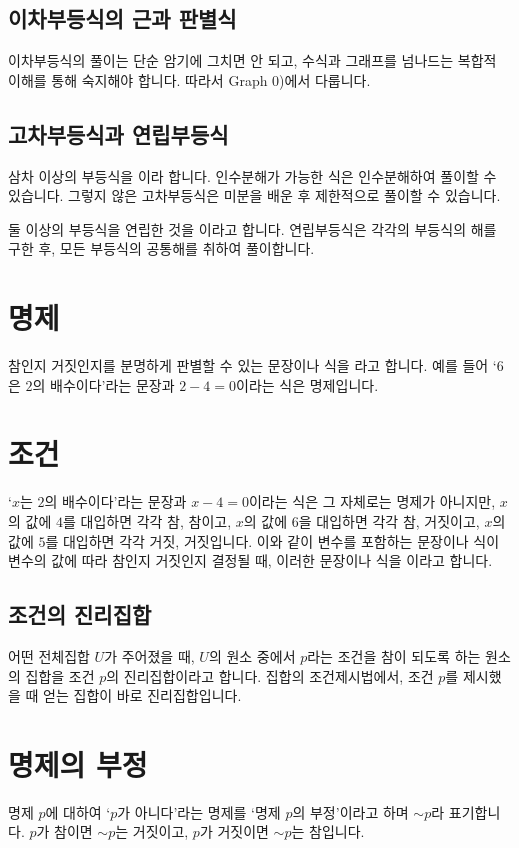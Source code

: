 \subsection{이차부등식의 근과 판별식}
이차부등식의 풀이는 단순 암기에 그치면 안 되고, 수식과 그래프를 넘나드는 복합적 이해를 통해 숙지해야 합니다. 따라서 Graph 0)에서 다룹니다.

\subsection{고차부등식과 연립부등식}
삼차 이상의 부등식을 이라 합니다. 인수분해가 가능한 식은 인수분해하여 풀이할 수 있습니다. 그렇지 않은 고차부등식은 미분을 배운 후 제한적으로 풀이할 수 있습니다.

둘 이상의 부등식을 연립한 것을 이라고 합니다. 연립부등식은 각각의 부등식의 해를 구한 후, 모든 부등식의 공통해를 취하여 풀이합니다.



\section{명제}
참인지 거짓인지를 분명하게 판별할 수 있는 문장이나 식을 라고 합니다. 예를 들어 `$6$은 $2$의 배수이다'라는 문장과 $2 - 4 = 0$이라는 식은 명제입니다.

\section{조건}
`$x$는 $2$의 배수이다'라는 문장과 $x-4 = 0$이라는 식은 그 자체로는 명제가 아니지만, $x$의 값에 $4$를 대입하면 각각 참, 참이고, $x$의 값에 $6$을 대입하면 각각 참, 거짓이고, $x$의 값에 $5$를 대입하면 각각 거짓, 거짓입니다. 이와 같이 변수를 포함하는 문장이나 식이 변수의 값에 따라 참인지 거짓인지 결정될 때, 이러한 문장이나 식을 이라고 합니다.

\subsection{조건의 진리집합}
어떤 전체집합 $U$가 주어졌을 때, $U$의 원소 중에서 $p$라는 조건을 참이 되도록 하는 원소의 집합을 조건 $p$의 진리집합이라고 합니다. 집합의 조건제시법에서, 조건 $p$를 제시했을 때 얻는 집합이 바로 진리집합입니다.

\section{명제의 부정}
명제 $p$에 대하여 `$p$가 아니다'라는 명제를 `명제 $p$의 부정'이라고 하며 $\sim p$라 표기합니다. $p$가 참이면 $\sim p$는 거짓이고, $p$가 거짓이면 $\sim p$는 참입니다.

